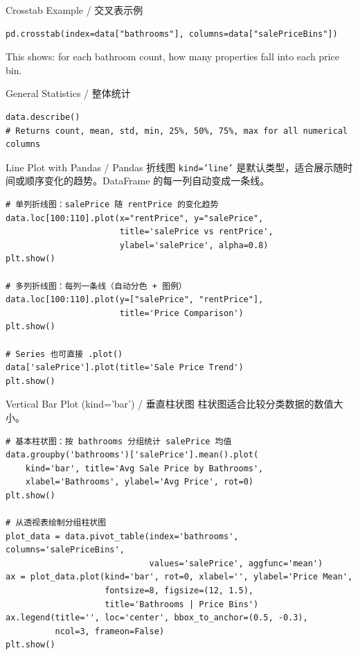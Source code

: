 \documentclass[11pt,a4paper]{report}
\let\oldtexttt\texttt
\renewcommand{\texttt}[1]{\textcolor{mainblue}{\oldtexttt{#1}}}
\begin{document}
\begin{examplebox}{Crosstab Example / 交叉表示例}
\begin{lstlisting}
pd.crosstab(index=data["bathrooms"], columns=data["salePriceBins"])
\end{lstlisting}
    This shows: for each bathroom count, how many properties fall into each price bin.
\end{examplebox}

\begin{examplebox}{General Statistics / 整体统计}
\begin{lstlisting}
data.describe()
# Returns count, mean, std, min, 25%, 50%, 75%, max for all numerical columns
\end{lstlisting}
\end{examplebox}

\begin{examplebox}{Line Plot with Pandas / Pandas 折线图}
    \texttt{kind='line'} 是默认类型，适合展示随时间或顺序变化的趋势。DataFrame 的每一列自动变成一条线。
\begin{lstlisting}
# 单列折线图：salePrice 随 rentPrice 的变化趋势
data.loc[100:110].plot(x="rentPrice", y="salePrice",
                       title='salePrice vs rentPrice',
                       ylabel='salePrice', alpha=0.8)
plt.show()

# 多列折线图：每列一条线（自动分色 + 图例）
data.loc[100:110].plot(y=["salePrice", "rentPrice"],
                       title='Price Comparison')
plt.show()

# Series 也可直接 .plot()
data['salePrice'].plot(title='Sale Price Trend')
plt.show()
\end{lstlisting}
\end{examplebox}

\begin{examplebox}{Vertical Bar Plot (kind='bar') / 垂直柱状图}
    柱状图适合比较分类数据的数值大小。
\begin{lstlisting}
# 基本柱状图：按 bathrooms 分组统计 salePrice 均值
data.groupby('bathrooms')['salePrice'].mean().plot(
    kind='bar', title='Avg Sale Price by Bathrooms',
    xlabel='Bathrooms', ylabel='Avg Price', rot=0)
plt.show()

# 从透视表绘制分组柱状图
plot_data = data.pivot_table(index='bathrooms', columns='salePriceBins',
                             values='salePrice', aggfunc='mean')
ax = plot_data.plot(kind='bar', rot=0, xlabel='', ylabel='Price Mean',
                    fontsize=8, figsize=(12, 1.5),
                    title='Bathrooms | Price Bins')
ax.legend(title='', loc='center', bbox_to_anchor=(0.5, -0.3),
          ncol=3, frameon=False)
plt.show()
\end{lstlisting}
\end{examplebox}
\end{document}
